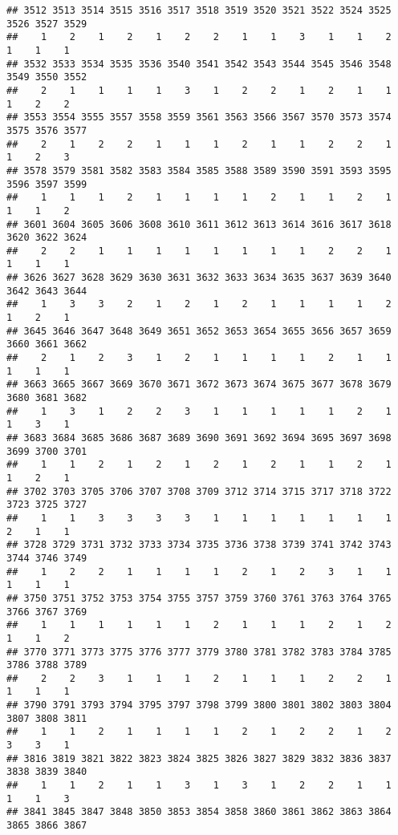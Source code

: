 \documentclass[
]{article}
\begin{document}
\begin{verbatim}
## 3512 3513 3514 3515 3516 3517 3518 3519 3520 3521 3522 3524 3525 3526 3527 3529 
##    1    2    1    2    1    2    2    1    1    3    1    1    2    1    1    1 
## 3532 3533 3534 3535 3536 3540 3541 3542 3543 3544 3545 3546 3548 3549 3550 3552 
##    2    1    1    1    1    3    1    2    2    1    2    1    1    1    2    2 
## 3553 3554 3555 3557 3558 3559 3561 3563 3566 3567 3570 3573 3574 3575 3576 3577 
##    2    1    2    2    1    1    1    2    1    1    2    2    1    1    2    3 
## 3578 3579 3581 3582 3583 3584 3585 3588 3589 3590 3591 3593 3595 3596 3597 3599 
##    1    1    1    2    1    1    1    1    2    1    1    2    1    1    1    2 
## 3601 3604 3605 3606 3608 3610 3611 3612 3613 3614 3616 3617 3618 3620 3622 3624 
##    2    2    1    1    1    1    1    1    1    1    2    2    1    1    1    1 
## 3626 3627 3628 3629 3630 3631 3632 3633 3634 3635 3637 3639 3640 3642 3643 3644 
##    1    3    3    2    1    2    1    2    1    1    1    1    2    1    2    1 
## 3645 3646 3647 3648 3649 3651 3652 3653 3654 3655 3656 3657 3659 3660 3661 3662 
##    2    1    2    3    1    2    1    1    1    1    2    1    1    1    1    1 
## 3663 3665 3667 3669 3670 3671 3672 3673 3674 3675 3677 3678 3679 3680 3681 3682 
##    1    3    1    2    2    3    1    1    1    1    1    2    1    1    3    1 
## 3683 3684 3685 3686 3687 3689 3690 3691 3692 3694 3695 3697 3698 3699 3700 3701 
##    1    1    2    1    2    1    2    1    2    1    1    2    1    1    2    1 
## 3702 3703 3705 3706 3707 3708 3709 3712 3714 3715 3717 3718 3722 3723 3725 3727 
##    1    1    3    3    3    3    1    1    1    1    1    1    1    2    1    1 
## 3728 3729 3731 3732 3733 3734 3735 3736 3738 3739 3741 3742 3743 3744 3746 3749 
##    1    2    2    1    1    1    1    2    1    2    3    1    1    1    1    1 
## 3750 3751 3752 3753 3754 3755 3757 3759 3760 3761 3763 3764 3765 3766 3767 3769 
##    1    1    1    1    1    1    2    1    1    1    2    1    2    1    1    2 
## 3770 3771 3773 3775 3776 3777 3779 3780 3781 3782 3783 3784 3785 3786 3788 3789 
##    2    2    3    1    1    1    2    1    1    1    2    2    1    1    1    1 
## 3790 3791 3793 3794 3795 3797 3798 3799 3800 3801 3802 3803 3804 3807 3808 3811 
##    1    1    2    1    1    1    1    2    1    2    2    1    2    3    3    1 
## 3816 3819 3821 3822 3823 3824 3825 3826 3827 3829 3832 3836 3837 3838 3839 3840 
##    1    1    2    1    1    3    1    3    1    2    2    1    1    1    1    3 
## 3841 3845 3847 3848 3850 3853 3854 3858 3860 3861 3862 3863 3864 3865 3866 3867 

\end{verbatim}
\end{document}

